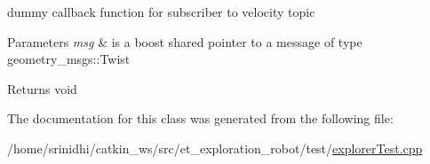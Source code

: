 dummy callback function for subscriber to velocity topic 


\begin{DoxyParams}{Parameters}
{\em msg} & is a boost shared pointer to a message of type geometry\+\_\+msgs\+::\+Twist\\
\hline
\end{DoxyParams}
\begin{DoxyReturn}{Returns}
void 
\end{DoxyReturn}


The documentation for this class was generated from the following file\+:\begin{DoxyCompactItemize}
\item 
/home/srinidhi/catkin\+\_\+ws/src/et\+\_\+exploration\+\_\+robot/test/\hyperlink{explorerTest_8cpp}{explorer\+Test.\+cpp}\end{DoxyCompactItemize}

